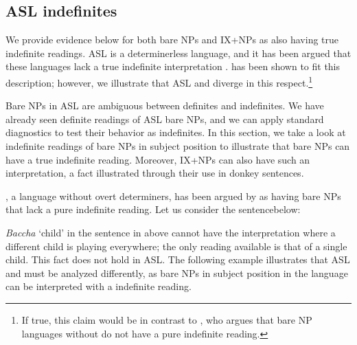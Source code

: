 \documentclass[output=paper,
modfonts
]{langscibook}
\begin{document}
\subsection{ASL indefinites}

We provide evidence below for both bare NPs and IX+NPs as also having true indefinite readings. ASL is a determinerless language, and it has been argued that these languages lack a true indefinite interpretation \citep{Dayal2004}.  has been shown to fit this description; however, we illustrate that ASL and  diverge in this respect.\footnote{ If true, this claim would be in contrast to \citet{Dayal2004}, who argues that bare NP languages without  do not have a pure indefinite reading. }

Bare NPs in ASL are ambiguous between definites and indefinites. We have already seen definite readings of ASL bare NPs, and we can apply standard diagnostics to test their behavior as indefinites. In this section, we take a look at  indefinite readings of bare NPs in subject position to illustrate that bare NPs can have a true indefinite reading. Moreover, IX+NPs can also have such an interpretation, a fact illustrated through their use in donkey sentences. 

, a language without overt determiners, has been argued by \citet{Dayal2004} as having bare NPs that lack a pure indefinite reading. Let us consider the sentence\largerpage below:

\begin{exe} 
\end{exe} 

\textit{Baccha} `child' in the sentence in  above cannot have the interpretation where a different child is playing everywhere; the only reading available is that of a single child. This fact does not hold in ASL. The following example illustrates that ASL and  must be analyzed differently, as bare NPs in subject position in the language can be interpreted with a  indefinite reading. 
\end{document}
